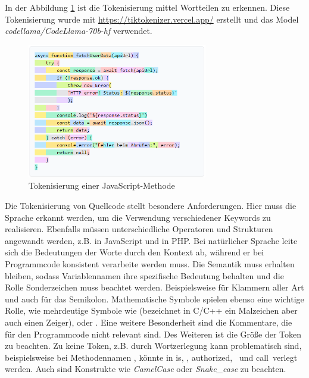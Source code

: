 In der Abbildung \ref{img:tokenize_javascript_method} ist die Tokenisierung mittel Wortteilen zu erkennen. Diese Tokenisierung wurde mit \href{https://tiktokenizer.vercel.app/}{https://tiktokenizer.vercel.app/} erstellt und das Model \textit{codellama/CodeLlama-70b-hf} verwendet.

\begin{center}
	\begin{figure}[!ht]
		\includegraphics[width=0.7\textwidth]{content/chapter_basics/images/tokenize.png}
		\centering
		\caption{Tokenisierung einer JavaScript-Methode}
		\label{img:tokenize_javascript_method}
	\end{figure}
\end{center}

Die Tokenisierung von Quellcode stellt besondere Anforderungen. Hier muss die Sprache erkannt werden, um die Verwendung verschiedener Keywords zu realisieren. Ebenfalls müssen unterschiedliche Operatoren und Strukturen angewandt werden, z.B. \code{===} in JavaScript und \code{::} in PHP. Bei natürlicher Sprache leite sich die Bedeutungen der Worte durch den Kontext ab, während er bei Programmcode konsistent verarbeite werden muss. Die Semantik muss erhalten bleiben, sodass Variablennamen ihre spezifische Bedeutung behalten und die Rolle Sonderzeichen muss beachtet werden. Beispielsweise für Klammern aller Art und auch für das Semikolon. Mathematische Symbole spielen ebenso eine wichtige Rolle, wie mehrdeutige Symbole wie \code{*} (bezeichnet in C/C++ ein Malzeichen aber auch einen Zeiger), \code{\&} oder \code{|}. Eine weitere Besonderheit sind die Kommentare, die für den Programmcode nicht relevant sind. Des Weiteren ist die Größe der Token zu beachten. Zu keine Token, z.B. durch Wortzerlegung kann problematisch sind, beispielsweise bei Methodennamen , könnte in \grqq is\grqq, \grqq \grqq, \grqq authorized\grqq, \grqq \grqq \ und \grqq call\grqq \ verlegt werden. Auch sind Konstrukte wie \textit{CamelCase} oder \textit{Snake\_case} zu beachten.


